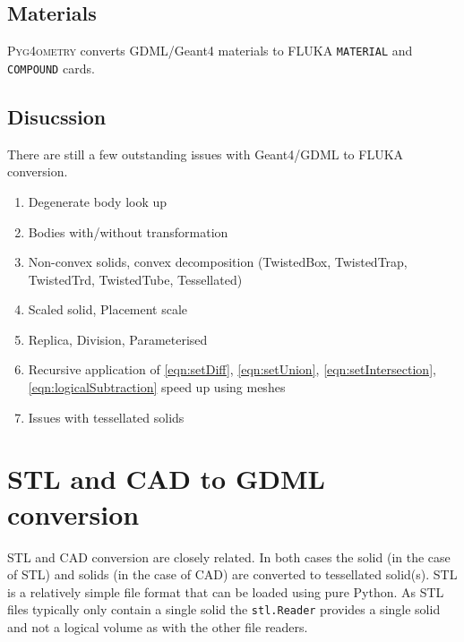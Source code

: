 \documentclass[final,5p,times,twocolumn]{elsarticle}
\newcommand{\pyinline}[1]{\lstinline[postbreak={}]{#1}}
\newcommand{\PYGEOMETRY}{\textsc{Pyg4ometry}}
\begin{document}
\subsection{Materials}
\PYGEOMETRY{} converts GDML/Geant4 materials to FLUKA \verb|MATERIAL| and \verb|COMPOUND| cards.

\subsection{Disucssion}
There are still a few outstanding issues with Geant4/GDML to FLUKA conversion. 

\begin{enumerate}
\item Degenerate body look up 
\item Bodies with/without transformation 
\item Non-convex solids, convex decomposition (TwistedBox, TwistedTrap, TwistedTrd, TwistedTube, Tessellated)
\item Scaled solid, Placement scale 
\item Replica, Division, Parameterised
\item Recursive application of \ref{eqn:setDiff}, \ref{eqn:setUnion}, \ref{eqn:setIntersection}, \ref{eqn:logicalSubtraction} speed up using meshes
\item Issues with tessellated solids 
\end{enumerate}

\section{STL and CAD to GDML conversion}
STL and CAD conversion are closely related. In both cases the solid 
(in the case of STL) and solids (in the case of CAD) are converted to 
tessellated solid(s). STL is a relatively simple file format that can
be loaded using pure Python. As STL files typically only contain a single 
solid the \pyinline{stl.Reader} provides a single solid and not a logical volume
as with the other file readers.
\end{document}
